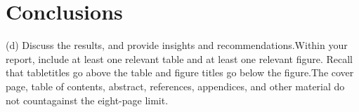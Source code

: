 \chapter{Conclusions}
\label{ch:conclusion}
\glsresetall












(d) Discuss the results, and provide insights and recommendations.Within your report, include at least one relevant table and at least one relevant figure. Recall that tabletitles go above the table and figure titles go below the figure.The cover page, table of contents, abstract, references, appendices, and other material do not countagainst the eight-page limit.


